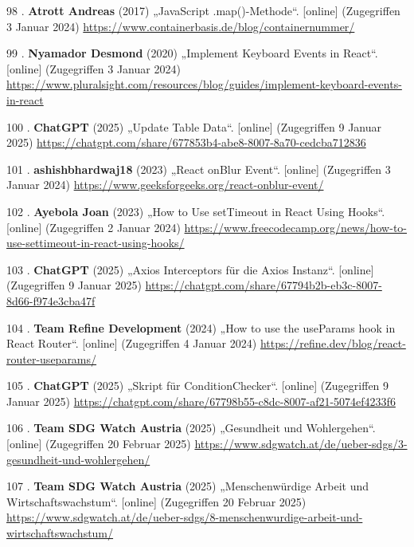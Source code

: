 \documentclass[
    headings=optiontotocandhead,%
    twoside,
    numbers=noenddot,%
    12pt, %
    titlepage, %
    parskip=full, %
    listof=leveldown, 
    numbers=noenddot, %
    a4paper,DIV=14,
    BCOR=15mm,
]{scrbook}
\newlength{\cslhangindent}
\newenvironment{cslreferences}%
  {\setlength{\parindent}{0pt}%
  \everypar{\setlength{\hangindent}{\cslhangindent}}\ignorespaces}%
  {\par}
\begin{document}
\begin{cslreferences}
\leavevmode\hypertarget{ref-ContainerBasis-Containernummern}{}%
98 . \textbf{Atrott Andreas} (2017) „JavaScript .map()-Methode``.
{[}online{]} (Zugegriffen 3 Januar 2024)
\url{https://www.containerbasis.de/blog/containernummer/}

\leavevmode\hypertarget{ref-Pluralsight-KeyboardEvents}{}%
99 . \textbf{Nyamador Desmond} (2020) „Implement Keyboard Events in
React``. {[}online{]} (Zugegriffen 3 Januar 2024)
\url{https://www.pluralsight.com/resources/blog/guides/implement-keyboard-events-in-react}

\leavevmode\hypertarget{ref-gpt-updateTableData}{}%
100 . \textbf{ChatGPT} (2025) „Update Table Data``. {[}online{]}
(Zugegriffen 9 Januar 2025)
\url{https://chatgpt.com/share/677853b4-abe8-8007-8a70-cedcba712836}

\leavevmode\hypertarget{ref-GeeksForGeeks-onBlur}{}%
101 . \textbf{ashishbhardwaj18} (2023) „React onBlur Event``.
{[}online{]} (Zugegriffen 3 Januar 2024)
\url{https://www.geeksforgeeks.org/react-onblur-event/}

\leavevmode\hypertarget{ref-FreeCodeCamp-setTimeOut}{}%
102 . \textbf{Ayebola Joan} (2023) „How to Use setTimeout in React Using
Hooks``. {[}online{]} (Zugegriffen 2 Januar 2024)
\url{https://www.freecodecamp.org/news/how-to-use-settimeout-in-react-using-hooks/}

\leavevmode\hypertarget{ref-gpt-AxiosInterceptors}{}%
103 . \textbf{ChatGPT} (2025) „Axios Interceptors für die Axios
Instanz``. {[}online{]} (Zugegriffen 9 Januar 2025)
\url{https://chatgpt.com/share/67794b2b-eb3c-8007-8d66-f974e3cba47f}

\leavevmode\hypertarget{ref-Refine-ReactRouter}{}%
104 . \textbf{Team Refine Development} (2024) „How to use the useParams
hook in React Router``. {[}online{]} (Zugegriffen 4 Januar 2024)
\url{https://refine.dev/blog/react-router-useparams/}

\leavevmode\hypertarget{ref-gpt-ConditionsCheckerScript}{}%
105 . \textbf{ChatGPT} (2025) „Skript für ConditionChecker``.
{[}online{]} (Zugegriffen 9 Januar 2025)
\url{https://chatgpt.com/share/67798b55-c8dc-8007-af21-5074ef4233f6}

\leavevmode\hypertarget{ref-sdg3}{}%
106 . \textbf{Team SDG Watch Austria} (2025) „Gesundheit und
Wohlergehen``. {[}online{]} (Zugegriffen 20 Februar 2025)
\url{https://www.sdgwatch.at/de/ueber-sdgs/3-gesundheit-und-wohlergehen/}

\leavevmode\hypertarget{ref-sdg8}{}%
107 . \textbf{Team SDG Watch Austria} (2025) „Menschenwürdige Arbeit und
Wirtschafts­wachstum``. {[}online{]} (Zugegriffen 20 Februar 2025)
\url{https://www.sdgwatch.at/de/ueber-sdgs/8-menschenwurdige-arbeit-und-wirtschaftswachstum/}


\end{cslreferences}
\end{document}
